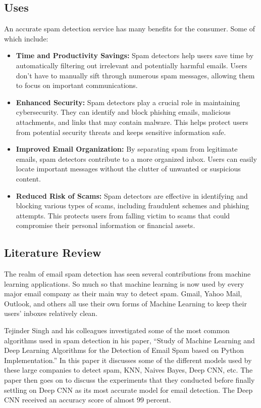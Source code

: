 \documentclass[conference]{IEEEtran}
\begin{document}
\subsection{\textbf{Uses}}
An accurate spam detection service has many benefits for the consumer. 
Some of which include:
 \begin{itemize}
     \item \textbf{Time and Productivity Savings:}
        Spam detectors help users save time by automatically filtering out irrelevant and potentially harmful emails. Users don't have to manually sift through numerous spam messages, allowing them to focus on important communications.
    \item \textbf{Enhanced Security:}
        Spam detectors play a crucial role in maintaining cybersecurity. They can identify and block phishing emails, malicious attachments, and links that may contain malware. This helps protect users from potential security threats and keeps sensitive information safe.
    \item \textbf{Improved Email Organization:}
        By separating spam from legitimate emails, spam detectors contribute to a more organized inbox. Users can easily locate important messages without the clutter of unwanted or suspicious content.
    \item \textbf{Reduced Risk of Scams:}
         Spam detectors are effective in identifying and blocking various types of scams, including fraudulent schemes and phishing attempts. This protects users from falling victim to scams that could compromise their personal information or financial assets.
 \end{itemize}

\newpage
\subsection{\textbf{Literature Review}}
The realm of email spam detection has seen several contributions from machine learning applications. So much so that machine learning is now used by every major email company as their main way to detect spam. Gmail, Yahoo Mail, Outlook, and others all use their own forms of Machine Learning to keep their users’ inboxes relatively clean.

Tejinder Singh and his colleagues investigated some of the most common algorithms used in spam detection in his paper, “Study of Machine Learning and Deep Learning Algorithms for the Detection of Email Spam based on Python Implementation.” In this paper it discusses some of the different models used by these large companies to detect spam, KNN, Naives Bayes, Deep CNN, etc. The paper then goes on to discuss the experiments that they conducted before finally settling on Deep CNN as its most accurate model for email detection. The Deep CNN received an accuracy score of almost 99 percent.
\end{document}
